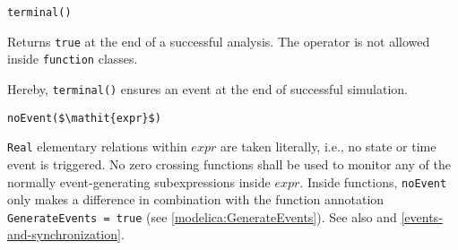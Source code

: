 \begin{operatordefinition}[terminal]
\begin{synopsis}\begin{lstlisting}
terminal()
\end{lstlisting}\end{synopsis}
\begin{semantics}
Returns \lstinline!true! at the end of a successful analysis.
The operator is not allowed inside \lstinline!function! classes.
\begin{nonnormative}
Hereby, \lstinline!terminal()! ensures an event at the end of successful simulation.
\end{nonnormative}
\end{semantics}
\end{operatordefinition}

\begin{operatordefinition}[noEvent]
\begin{synopsis}\begin{lstlisting}
noEvent($\mathit{expr}$)
\end{lstlisting}\end{synopsis}
\begin{semantics}
\lstinline!Real! elementary relations within $\mathit{expr}$ are taken literally, i.e., no state or time event is triggered.
No zero crossing functions shall be used to monitor any of the normally event-generating subexpressions inside $\mathit{expr}$.
Inside functions, \lstinline!noEvent! only makes a difference in combination with the function annotation \lstinline!GenerateEvents = true! (see \cref{modelica:GenerateEvents}).
See also  and \cref{events-and-synchronization}.
\end{semantics}
\end{operatordefinition}

